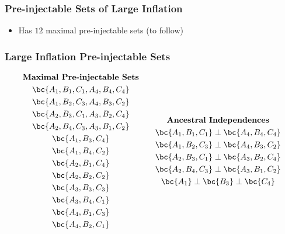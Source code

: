 \documentclass[
    hyperref={bookmarks=false},%
    xcolor={dvipsnames},
]{beamer}
\begin{document}
\begin{frame}
    \frametitle{Pre-injectable Sets of Large Inflation}
    \begin{center}
        \scalebox{0.8}{}
    \end{center}
    \begin{itemize}
        \item Has $12$ maximal pre-injectable sets (to follow)
    \end{itemize}
\end{frame}

\begin{frame}
    \frametitle{Large Inflation Pre-injectable Sets}
    \begin{equation*}
        \begin{gathered}
            \textbf{Maximal Pre-injectable Sets} \\
            \bc{A_1, B_1, C_1, A_4, B_4, C_4} \\
            \bc{A_1, B_2, C_3, A_4, B_3, C_2} \\
            \bc{A_2, B_3, C_1, A_3, B_2, C_4} \\
            \bc{A_2, B_4, C_3, A_3, B_1, C_2} \\
            \bc{A_1, B_3, C_4} \\
            \bc{A_1, B_4, C_2} \\
            \bc{A_2, B_1, C_4} \\
            \bc{A_2, B_2, C_2} \\
            \bc{A_3, B_3, C_3} \\
            \bc{A_3, B_4, C_1} \\
            \bc{A_4, B_1, C_3} \\
            \bc{A_4, B_2, C_1}
        \end{gathered}
        \qquad
        \begin{gathered}
            \textbf{Ancestral Independences} \\
            \bc{A_1, B_1, C_1} \ancestralindep \bc{A_4, B_4, C_4} \\
            \bc{A_1, B_2, C_3} \ancestralindep \bc{A_4, B_3, C_2} \\
            \bc{A_2, B_3, C_1} \ancestralindep \bc{A_3, B_2, C_4} \\
            \bc{A_2, B_4, C_3} \ancestralindep \bc{A_3, B_1, C_2} \\
            \bc{A_1} \ancestralindep \bc{B_3} \ancestralindep \bc{C_4} \\

\end{gathered}
\end{equation*}
\end{frame}
\end{document}
